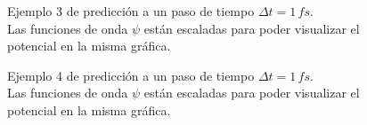 \begin{figure}[H]
  \centering
  \caption{Ejemplo 3 de predicción a un paso de tiempo $\Delta t = 1\,fs$.\\ Las funciones de onda $\psi$ están escaladas para poder visualizar el potencial en la misma gráfica. }
  \label{fig:1step3}
\end{figure}

\begin{figure}[!htbp]
  \centering
  \caption{Ejemplo 4 de predicción a un paso de tiempo $\Delta t = 1\,fs$.\\ Las funciones de onda $\psi$ están escaladas para poder visualizar el potencial en la misma gráfica.}
  \label{fig:1step4}
\end{figure}

